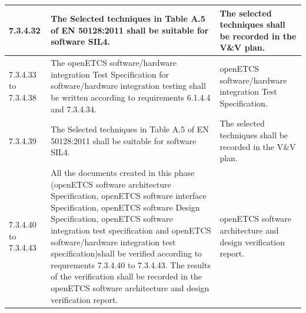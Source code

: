 \documentclass{template/openetcs_report}
\begin{document}
{\begin{longtable}{|p{2cm}|p{9cm}|p{3cm}|}
\hline
7.3.4.32 & The Selected techniques in Table A.5 of EN 50128:2011 shall be suitable for software SIL4.
& The selected techniques shall be recorded in the V\&V plan.\\ 
\hline
7.3.4.33 to 7.3.4.38 & The openETCS software/hardware integration Test Specification for software/hardware integration testing shall be written according to requirements 6.1.4.4 and 7.3.4.34. & openETCS software/hardware integration Test Specification.\\ 
\hline
7.3.4.39 & The Selected techniques in Table A.5 of EN 50128:2011 shall be suitable for software SIL4.
& The selected techniques shall be recorded in the V\&V plan.\\ 
\hline
7.3.4.40 to 7.3.4.43 & All the documents created in this phase (openETCS software architecture Specification, openETCS software interface Specification, openETCS software Design Specification,  openETCS software integration test specification and  openETCS software/hardware integration test specification)shall be verified according to requrements 7.3.4.40 to 7.3.4.43.
The results of the verification shall be recorded in the openETCS software architecture and design verification report. & openETCS software architecture and design verification report.\\ 
\hline
\end{longtable}}
\end{document}
